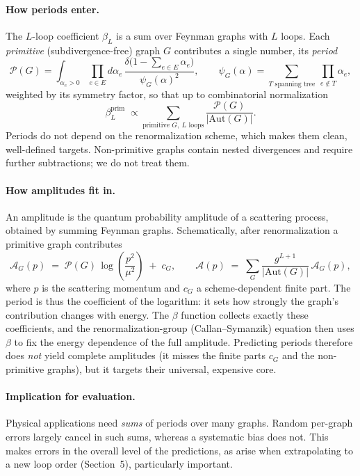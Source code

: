 \documentclass[11pt]{article}
\begin{document}
\paragraph{How periods enter.} The $L$-loop coefficient $\beta_L$ is a sum over Feynman graphs with
$L$ loops. Each \emph{primitive} (subdivergence-free) graph $G$ contributes a single number, its
\emph{period}
\begin{equation*}
\mathcal{P}(G) = \int_{\alpha_e>0} \prod_{e\in E} d\alpha_e\,
\frac{\delta\big(1-\sum_{e\in E}\alpha_e\big)}{\psi_G(\alpha)^2},\qquad
\psi_G(\alpha)=\sum_{T\text{ spanning tree}}\ \prod_{e\notin T}\alpha_e ,
\end{equation*}
weighted by its symmetry factor, so that up to combinatorial normalization
\begin{equation*}
\beta_L^{\text{prim}} \;\propto \sum_{\text{primitive } G,\ L\text{ loops}} \frac{\mathcal{P}(G)}{|\mathrm{Aut}(G)|}.
\end{equation*}
Periods do not depend on the renormalization scheme, which makes them clean, well-defined targets.
Non-primitive graphs contain nested divergences and require further subtractions; we do not treat them.

\paragraph{How amplitudes fit in.} An amplitude is the quantum probability amplitude of a scattering
process, obtained by summing Feynman graphs. Schematically, after renormalization a primitive graph
contributes
\begin{equation*}
\mathcal{A}_G(p) \;=\; \mathcal{P}(G)\,\log\!\left(\frac{p^2}{\mu^2}\right) \;+\; c_G,
\qquad
\mathcal{A}(p) \;=\; \sum_{G} \frac{g^{L+1}}{|\mathrm{Aut}(G)|}\,\mathcal{A}_G(p),
\end{equation*}
where $p$ is the scattering momentum and $c_G$ a scheme-dependent finite part. The period is thus the
coefficient of the logarithm: it sets how strongly the graph's contribution changes with energy.
The $\beta$ function collects exactly these coefficients, and the renormalization-group
(Callan--Symanzik) equation then uses $\beta$ to fix the energy dependence of the full amplitude.
Predicting periods therefore does \emph{not} yield complete amplitudes (it misses the finite parts
$c_G$ and the non-primitive graphs), but it targets their universal, expensive core.

\paragraph{Implication for evaluation.} Physical applications need \emph{sums} of periods over many
graphs. Random per-graph errors largely cancel in such sums, whereas a systematic bias does not. This
makes errors in the overall level of the predictions, as arise when extrapolating to a new loop
order (Section~5), particularly important.
\end{document}
